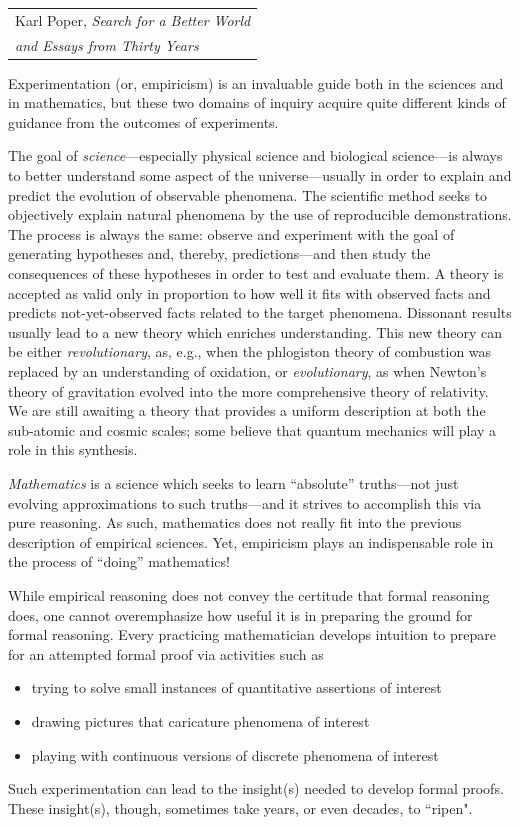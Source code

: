 \hfill{\small
\begin{tabular}{l}
Karl Poper, 
{\it Search for a Better World} \\
\hfill{\em and Essays from Thirty Years}%
\end{tabular} }

\bigskip

\noindent
Experimentation (or, empiricism) is an invaluable guide both in the sciences and in mathematics, but these two domains of inquiry acquire quite different kinds of guidance from the outcomes of experiments.

The goal of {\em science}---especially physical science and biological science---is always to better understand some aspect of the universe---usually in order to explain and predict the evolution of observable phenomena.  The scientific method seeks to objectively explain natural phenomena by the use of reproducible demonstrations.  The process is always the same: observe and experiment with the goal of generating hypotheses and, thereby, predictions---and then study the consequences of these hypotheses in order to test and evaluate them.  A theory is accepted as valid only in proportion to how well it fits with observed facts and predicts not-yet-observed facts related to the target phenomena.  Dissonant results usually lead to a new theory which enriches understanding.  This new theory can be either {\em revolutionary}, as, e.g., when the phlogiston theory of combustion was replaced by an understanding of oxidation, or {\em evolutionary}, as when Newton's theory of gravitation evolved into the more comprehensive theory of relativity.  We are still awaiting a theory that provides a uniform description at both the sub-atomic and cosmic scales; some believe that quantum mechanics will play a role in this synthesis.

\smallskip

{\em Mathematics} is a science which seeks to learn ``absolute'' truths---not just evolving approximations to such truths---and it strives to accomplish this via pure reasoning.  As such, mathematics does not really fit into the previous description of empirical sciences.  Yet, empiricism plays an indispensable role in the process of ``doing'' mathematics!

\smallskip

While empirical reasoning does not convey the certitude that formal reasoning does, one cannot overemphasize how useful it is in preparing the ground for formal reasoning.  Every practicing mathematician develops intuition to prepare for an attempted formal proof via activities such as
\begin{itemize}
\item
trying to solve small instances of quantitative assertions of interest
\medskip\item
drawing pictures that caricature phenomena of interest
\medskip\item
playing with continuous versions of discrete phenomena of interest
\end{itemize}
Such experimentation can lead to the insight(s) needed to develop formal proofs.  These insight(s), though, sometimes take years, or even decades, to ``ripen".


